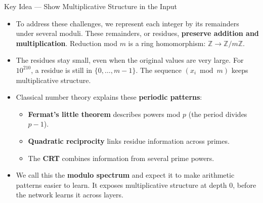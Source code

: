 \documentclass[aspectratio=169,10pt]{beamer}
\newcommand{\tightlist}{\setlength{\itemsep}{0.2em}}
\newcommand{\readout}[1]{\textcolor{readoutblue}{{\mdseries #1}}}
\begin{document}
\begin{frame}{Key Idea --- Show Multiplicative Structure in the Input}
\small
  \begin{itemize}\tightlist
    \item \readout{To address these challenges, we represent each integer by its remainders under several moduli.}
          \readout{These remainders, or residues, \textbf{preserve addition and multiplication}.}
          Reduction mod $m$ is a \alert{ring homomorphism}:
          $\mathbb{Z} \to \mathbb{Z}/m\mathbb{Z}$.
    \item \readout{The residues stay small, even when the original values are very large.}
          For $10^{210}$, a residue is still in $\{0,\dots,m-1\}$.
          The sequence $(x_i \bmod m)$ keeps multiplicative structure.
    \item Classical number theory explains these \textbf{periodic patterns}:
      \begin{itemize}
        \item \textbf{Fermat's little theorem} describes powers mod $p$
              (the period divides $p-1$).
        \item \textbf{Quadratic reciprocity} links residue information across primes.
        \item The \textbf{CRT} combines information from several prime powers.
      \end{itemize}
    \item \readout{We call this the \textbf{modulo spectrum} and expect it to make arithmetic patterns easier to learn.}
          It exposes multiplicative structure \alert{at depth 0}, before the network learns it across layers.
  \end{itemize}
\end{frame}
\end{document}
